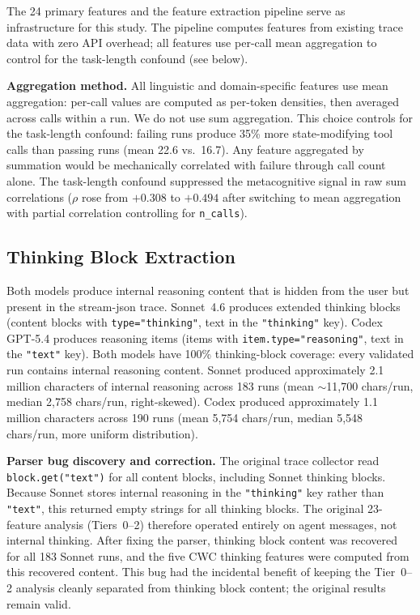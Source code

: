 \documentclass[11pt]{article}
\newcommand{\feat}[1]{\texttt{#1}}
\begin{document}
The 24 primary features and the feature extraction pipeline serve as infrastructure for this study.
The pipeline computes features from existing trace data with zero API overhead; all features use per-call mean aggregation to control for the task-length confound (see below).

\textbf{Aggregation method.}
All linguistic and domain-specific features use mean aggregation: per-call values are computed as per-token densities, then averaged across calls within a run.
We do not use sum aggregation.
This choice controls for the task-length confound: failing runs produce 35\% more state-modifying tool calls than passing runs (mean 22.6 vs.\ 16.7).
Any feature aggregated by summation would be mechanically correlated with failure through call count alone.
The task-length confound suppressed the metacognitive signal in raw sum correlations ($\rho$ rose from $+0.308$ to $+0.494$ after switching to mean aggregation with partial correlation controlling for \feat{n\_calls}).

\subsection{Thinking Block Extraction}
\label{sec:thinking}

Both models produce internal reasoning content that is hidden from the user but present in the stream-json trace.
Sonnet~4.6 produces extended thinking blocks (content blocks with \texttt{type\allowbreak{}="thinking"}, text in the \texttt{"thinking"} key).
Codex GPT-5.4 produces reasoning items (items with \texttt{item.type\allowbreak{}="reasoning"}, text in the \texttt{"text"} key).
Both models have 100\% thinking-block coverage: every validated run contains internal reasoning content.
Sonnet produced approximately 2.1 million characters of internal reasoning across 183 runs (mean ${\sim}$11,700 chars/run, median 2,758 chars/run, right-skewed).
Codex produced approximately 1.1 million characters across 190 runs (mean 5,754 chars/run, median 5,548 chars/run, more uniform distribution).

\textbf{Parser bug discovery and correction.}
The original trace collector read \texttt{block.get("text")} for all content blocks, including Sonnet thinking blocks.
Because Sonnet stores internal reasoning in the \texttt{"thinking"} key rather than \texttt{"text"}, this returned empty strings for all thinking blocks.
The original 23-feature analysis (Tiers~0--2) therefore operated entirely on agent messages, not internal thinking.
After fixing the parser, thinking block content was recovered for all 183 Sonnet runs, and the five CWC thinking features were computed from this recovered content.
This bug had the incidental benefit of keeping the Tier~0--2 analysis cleanly separated from thinking block content; the original results remain valid.
\end{document}
